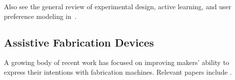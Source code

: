 Also see the general review of experimental design, active learning, and user preference modeling in~\cite{brochu_tutorial_2010}.

\subsection{Assistive Fabrication Devices}

A growing body of recent work has focused on improving makers' ability to express their intentions with fabrication machines.
Relevant papers include
\cite{zoran_human-computer_2013}
\cite{zoran_hybrid_2014}
\cite{tanenbaum_democratizing_2013}
\cite{mueller_interactive_2012}
\cite{mueller_laserorigami_2013}
\cite{mueller_wireprint_2014}
\cite{follmer_inform_2013}
.
